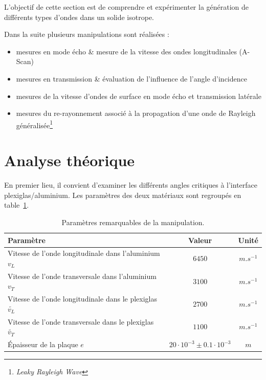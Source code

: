 L'objectif de cette section est de comprendre et expérimenter la génération de différents types d'ondes dans un solide isotrope.

Dans la suite plusieurs manipulations sont réalisées :

\begin{itemize}
    \item mesures en mode écho \& mesure de la vitesse des ondes longitudinales (A-Scan)
    \item mesures en transmission \& évaluation de l'influence de l'angle d'incidence
    \item mesures de la vitesse d'ondes de surface en mode écho et transmission latérale
    \item mesures du re-rayonnement associé à la propagation d'une onde de Rayleigh généralisée\footnote{\textit{Leaky Rayleigh Wave}}
\end{itemize}

\section{Analyse théorique}

\label{volsurf:theo}

En premier lieu, il convient d'examiner les différents angles critiques à l'interface plexiglas/aluminium. Les paramètres des deux matériaux sont regroupés en table~\ref{volsurf:params}.

\begin{table}[h]
    \centering
    \begin{tabular}{l|cc}
        Paramètre & Valeur & Unité\\\hline
        Vitesse de l'onde longitudinale dans l'aluminium $v_L$ & $6450$ & $m.s^{-1}$\\
        Vitesse de l'onde transversale dans l'aluminium $v_T$ & $3100$ & $m.s^{-1}$\\
        Vitesse de l'onde longitudinale dans le plexiglas $\tilde{v_L}$ & $2700$ & $m.s^{-1}$\\
        Vitesse de l'onde transversale dans le plexiglas $\tilde{v_T}$ & $1100$ & $m.s^{-1}$\\
        Épaisseur de la plaque $e$ & $20\cdot 10^{-3} \pm 0.1\cdot 10^{-3}$ & $m$\\
    \end{tabular}
    \caption{Paramètres remarquables de la manipulation.}
    \label{volsurf:params}
\end{table}

